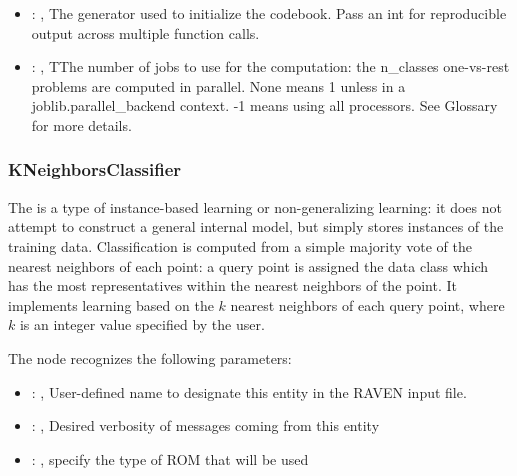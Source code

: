 \begin{itemize}
    \item {}: , 
      The generator used to initialize the codebook. Pass an int
      for reproducible output across multiple function calls.

    \item {}: , 
      TThe number of jobs to use for the computation: the n\_classes one-vs-rest
      problems are computed in parallel. None means 1 unless in a joblib.parallel\_backend
      context. -1 means using all processors. See Glossary for more details.
  \end{itemize}


\subsubsection{KNeighborsClassifier}
  The  is a type of instance-based learning or
  non-generalizing learning: it does not attempt to construct a general internal
  model, but simply stores instances of the training data.                          Classification
  is computed from a simple majority vote of the nearest neighbors                          of each
  point: a query point is assigned the data class which has the most
  representatives within the nearest neighbors of the point.                          It implements
  learning based on the $k$ nearest neighbors of each query point,                          where
  $k$ is an integer value specified by the user.

  The  node recognizes the following parameters:
    \begin{itemize}
      \item {}: , 
        User-defined name to designate this entity in the RAVEN input file.
      \item {}: , 
        Desired verbosity of messages coming from this entity
      \item {}: , 
        specify the type of ROM that will be used
  \end{itemize}

